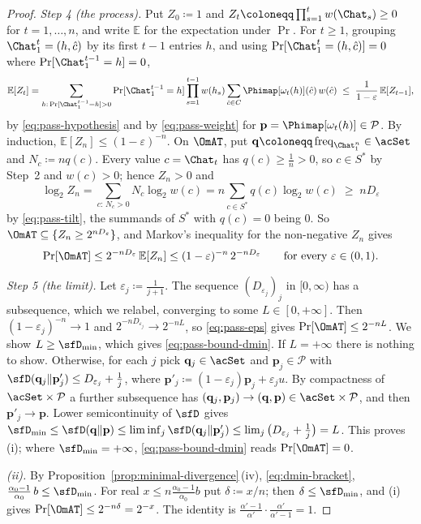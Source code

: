 \begin{proof}
\emph{Step 4 (the process).} Put $Z_0\coloneqq1$ and
$Z_t\coloneqq\prod_{s=1}^{t}w(\Chat_s)\ge0$ for $t=1,\dots,n$, and write
$\mathbb E$ for the expectation under $\Pr$. For $t\ge1$, grouping
$\Chat_1^{t}=(h,\hat c)$ by its first $t-1$ entries $h$, and using
$\Pr[\Chat_1^t=(h,\hat c)]=0$ where $\Pr[\Chat_1^{t-1}=h]=0$,
\begin{equation*}
  \mathbb E[Z_t]
  =\sum_{h:\,\Pr[\Chat_1^{t-1}=h]>0}\Pr[\Chat_1^{t-1}=h]
  \prod_{s=1}^{t-1}w(h_s)\sum_{\hat c\in C}
  \Phimap[\omega_t(h)](\hat c)\,w(\hat c)
  \;\le\;\frac{1}{1-\varepsilon}\,\mathbb E[Z_{t-1}],
\end{equation*}
by \eqref{eq:pass-hypothesis} and by \eqref{eq:pass-weight} for
$\mathbf p=\Phimap[\omega_t(h)]\in\mathcal{P}$. By induction,
$\mathbb E[Z_n]\le(1-\varepsilon)^{-n}$. On $\OmAT$, put
$\mathbf q\coloneqq\operatorname{freq}_{\Chat_1^n}\in\acSet$ and
$N_c\coloneqq nq(c)$. Every value $c=\Chat_t$ has $q(c)\ge\frac1n>0$, so
$c\in S^{*}$ by Step~2 and $w(c)>0$; hence $Z_n>0$ and
\begin{equation*}
  \log_2Z_n=\sum_{c:\,N_c>0}N_c\log_2w(c)
  =n\sum_{c\in S^{*}}q(c)\log_2w(c)\;\ge\;nD_{\varepsilon}
\end{equation*}
by \eqref{eq:pass-tilt}, the summands of $S^{*}$ with $q(c)=0$ being $0$. So
$\OmAT\subseteq\{Z_n\ge2^{nD_{\varepsilon}}\}$, and Markov's inequality for
the non-negative $Z_n$ gives
\begin{equation}\label{eq:pass-eps}
  \Pr[\OmAT]\le2^{-nD_{\varepsilon}}\,\mathbb E[Z_n]
  \le(1-\varepsilon)^{-n}\,2^{-nD_{\varepsilon}}
  \qquad\text{for every }\varepsilon\in(0,1).
\end{equation}

\emph{Step 5 (the limit).} Let $\varepsilon_j\coloneqq\frac{1}{j+1}$. The
sequence $(D_{\varepsilon_j})_j$ in $[0,\infty)$ has a subsequence, which we
relabel, converging to some $L\in[0,+\infty]$. Then
$(1-\varepsilon_j)^{-n}\to1$ and $2^{-nD_{\varepsilon_j}}\to2^{-nL}$, so
\eqref{eq:pass-eps} gives $\Pr[\OmAT]\le2^{-nL}$. We show $L\ge\sfD_{\min}$,
which gives \eqref{eq:pass-bound-dmin}. If $L=+\infty$ there is nothing to
show. Otherwise, for each $j$ pick $\mathbf q_j\in\acSet$ and
$\mathbf p_j\in\mathcal{P}$ with
$\sfD(\mathbf q_j\|\mathbf p'_j)\le D_{\varepsilon_j}+\frac1j$, where
$\mathbf p'_j\coloneqq(1-\varepsilon_j)\mathbf p_j+\varepsilon_ju$. By
compactness of $\acSet\times\mathcal{P}$ a further subsequence has
$(\mathbf q_j,\mathbf p_j)\to(\mathbf q,\mathbf p)\in\acSet\times\mathcal{P}$,
and then $\mathbf p'_j\to\mathbf p$. Lower semicontinuity of $\sfD$ gives
$\sfD_{\min}\le\sfD(\mathbf q\|\mathbf p)\le\liminf_j\sfD(\mathbf q_j\|\mathbf p'_j)
\le\lim_j\big(D_{\varepsilon_j}+\tfrac1j\big)=L$. This proves (i); where
$\sfD_{\min}=+\infty$, \eqref{eq:pass-bound-dmin} reads $\Pr[\OmAT]=0$.

\emph{(ii).} By Proposition~\ref{prop:minimal-divergence}\,(iv),
\eqref{eq:dmin-bracket}, $\frac{\alpha_0-1}{\alpha_0}\,b\le\sfD_{\min}$. For
real $x\le n\frac{\alpha_0-1}{\alpha_0}b$ put $\delta\coloneqq x/n$; then
$\delta\le\sfD_{\min}$, and (i) gives $\Pr[\OmAT]\le2^{-n\delta}=2^{-x}$. The identity
is $\frac{\alpha'-1}{\alpha'}\cdot\frac{\alpha'}{\alpha'-1}=1$.
\end{proof}
